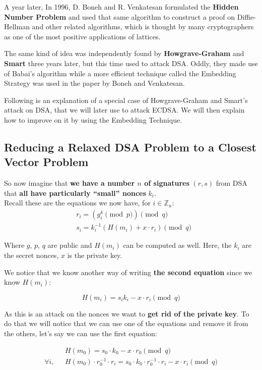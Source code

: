 \documentclass[a4paper,11pt]{article}
\begin{document}
A year later, In 1996, D. Boneh and R. Venkatesan\cite{boneh-venkatesan} formulated the \textbf{Hidden Number Problem} and used that same algorithm to construct a proof on Diffie-Hellman and other related algorithms, which is thought by many cryptographers as one of the most positive applications of lattices.

The same kind of idea was independently found by \textbf{Howgrave-Graham} and \textbf{Smart} three years later\cite{HG-smart}, but this time used to attack DSA. Oddly, they made use of Babai's algorithm while a more efficient technique called the Embedding Strategy was used in the paper by Boneh and Venkatesan.

Following is an explanation of a special case of Howgrave-Graham and Smart's attack on DSA, that we will later use to attack ECDSA. We will then explain how to improve on it by using the Embedding Technique.

\subsection{Reducing a Relaxed DSA Problem to a Closest Vector Problem}

So now imagine that \textbf{we have a number $n$ of signatures} $(r,s)$ from DSA that \textbf{all have particularly ``small'' nonces} $k_i$.\\
Recall these are the equations we now have, for $i \in \mathbb{Z}_n$:
\begin{align*}
&r_i = (g^k_i \pmod{p}) \pmod{q}\\
&s_i = k_i^{-1} ( H(m_i) + x \cdot r_i ) \pmod{q}
\end{align*}

Where $g$, $p$, $q$ are public and $H(m_i)$ can be computed as well. Here, the $k_i$ are the secret nonces, $x$ is the private key.

We notice that we know another way of writing \textbf{the second equation} since we know $H(m_i)$:

$$ H(m_i) = s_i k_i - x \cdot r_i \pmod{q} $$

As this is an attack on the nonces we want to \textbf{get rid of the private key}. To do that we will notice that we can use one of the equations and remove it from the others, let's say we can use the first equation:

\begin{align*}
&H(m_0) = s_0 \cdot k_0 - x \cdot r_0 \pmod{q}\\
\forall i, \text{ } &H(m_0) \cdot r_0^{-1} \cdot r_i = s_0 \cdot k_0 \cdot r_0^{-1} \cdot r_i - x \cdot r_i \pmod{q}
\end{align*}
\end{document}
